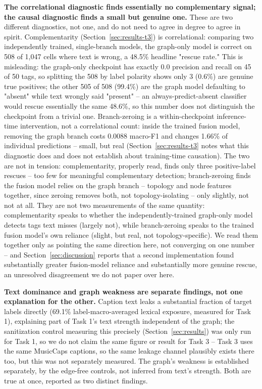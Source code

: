 \textbf{The correlational diagnostic finds essentially no complementary signal; the causal
diagnostic finds a small but genuine one.} These are two different diagnostics, not one, and do not need to agree in degree to agree in
spirit. Complementarity (Section~\ref{sec:results-t3}) is correlational: comparing two
independently trained, single-branch models, the graph-only model is correct on 508 of
1{,}047 cells where text is wrong, a 48.5\% headline "rescue rate." This is misleading: the
graph-only checkpoint has exactly 0.0 precision and recall on 45 of 50 tags, so splitting the
508 by label polarity shows only 3 (0.6\%) are genuine true positives; the other 505 of 508
(99.4\%) are the graph model defaulting to "absent" while text wrongly said "present" -- an
always-predict-absent classifier would rescue essentially the same 48.6\%, so this number
does not distinguish the checkpoint from a trivial one. Branch-zeroing is a within-checkpoint
inference-time intervention, not a correlational count: inside the trained fusion model,
removing the graph branch costs 0.0088 macro-F1 and changes 1.66\% of individual
predictions -- small, but real (Section~\ref{sec:results-t3} notes what this diagnostic does
and does not establish about training-time causation). The two are not in tension:
complementarity, properly read, finds only three positive-label rescues -- too few for
meaningful complementary detection; branch-zeroing finds the fusion model relies on the graph
branch -- topology and node features together, since zeroing removes both, not
topology-isolating -- only slightly, not not at all. They are not two measurements of the
same quantity: complementarity speaks to whether the independently-trained graph-only model
detects tags text misses (largely not), while branch-zeroing speaks to the trained fusion
model's own reliance (slight, but real, not topology-specific). We read them together only as
pointing the same direction here, not converging on one number -- and
Section~\ref{sec:discussion} reports that a second implementation found substantially greater
fusion-model reliance and substantially more genuine rescue, an unresolved disagreement we do
not paper over here.

\textbf{Text dominance and graph weakness are separate findings, not one explanation for the
other.} Caption text leaks a substantial fraction of target labels directly (69.1\%
label-macro-averaged lexical exposure, measured for Task 1), explaining part of Task 1's text
strength independent of the graph; the sanitization control measuring this precisely
(Section~\ref{sec:results}) was only run for Task 1, so we do not claim the same figure or
result for Task 3 -- Task 3 uses the same MusicCaps captions, so the same leakage channel
plausibly exists there too, but this was not separately measured. The graph's weakness is
established separately, by the edge-free controls, not inferred from text's strength. Both
are true at once, reported as two distinct findings.

